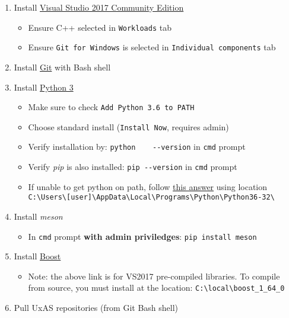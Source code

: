 \begin{enumerate}
\def\labelenumi{\arabic{enumi}.}
\item
  Install \href{https://www.visualstudio.com/downloads/}{Visual Studio
  2017 Community Edition}

  \begin{itemize}
  \item
    Ensure C++ selected in \texttt{Workloads} tab
  \item
    Ensure \texttt{Git\ for\ Windows} is selected in
    \texttt{Individual\ components} tab
  \end{itemize}
\item
  Install \href{https://git-scm.com/download/win}{Git} with Bash shell
\item
  Install
  \href{https://www.python.org/ftp/python/3.6.1/python-3.6.1.exe}{Python
  3}

  \begin{itemize}
  \item
    Make sure to check \texttt{Add\ Python\ 3.6\ to\ PATH}
  \item
    Choose standard install (\texttt{Install\ Now}, requires admin)
  \item
    Verify installation by: \texttt{python\ \ \ \ -\/-version} in
    \texttt{cmd} prompt
  \item
    Verify \emph{pip} is also installed: \texttt{pip\ -\/-version} in
    \texttt{cmd} prompt
  \item
    If unable to get python on path, follow
    \href{https://stackoverflow.com/questions/23400030/windows-7-add-path}{this
    answer} using location
    \texttt{C:\textbackslash{}Users\textbackslash{}{[}user{]}\textbackslash{}AppData\textbackslash{}Local\textbackslash{}Programs\textbackslash{}Python\textbackslash{}Python36-32\textbackslash{}}
  \end{itemize}
\item
  Install \emph{meson}

  \begin{itemize}
  \tightlist
  \item
    In \texttt{cmd} prompt \textbf{with admin priviledges}:
    \texttt{pip\ install\ meson}
  \end{itemize}
\item
  Install
  \href{https://sourceforge.net/projects/boost/files/boost-binaries/1.64.0/boost_1_64_0-msvc-14.1-32.exe/download}{Boost}

  \begin{itemize}
  \tightlist
  \item
    Note: the above link is for VS2017 pre-compiled libraries. To
    compile from source, you must install at the location:
    \texttt{C:\textbackslash{}local\textbackslash{}boost\_1\_64\_0}
  \end{itemize}
\item
  Pull UxAS repositories (from Git Bash shell)


\end{enumerate}
